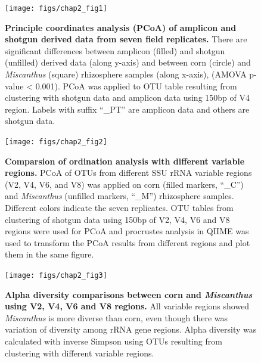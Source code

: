 \documentclass[]{msu-thesis}
\begin{document}
\begin{figure}[tbph!]
  \centering
  \texttt{[image: figs/chap2\_fig1]}
  \caption[Principle coordinates analysis (PCoA) of amplicon and shotgun derived data from seven field replicates]{\textbf{Principle coordinates analysis (PCoA) of amplicon and shotgun derived data from seven field replicates.} There are significant differences between amplicon (filled) and shotgun (unfilled) derived data (along y-axis) and between corn (circle) and \textit{Miscanthus} (square) rhizosphere samples (along x-axis), (AMOVA p-value < 0.001). PCoA was applied to OTU table resulting from clustering with shotgun data and amplicon data using 150bp of V4 region. Labels with suffix ``\_PT'' are amplicon data and others are shotgun data.}
  \label{fig:chap2Fig1}
\end{figure}


\begin{figure}[tbph!]
  \centering
  \texttt{[image: figs/chap2\_fig2]}
  \caption[Comparsion of ordination analysis with different variable regions]{\textbf{Comparsion of ordination analysis with different variable regions.} PCoA of OTUs from different SSU rRNA variable regions (V2, V4, V6, and V8) was applied on corn (filled markers, ``\_C'') and \textit{Miscanthus} (unfilled markers, ``\_M'') rhizosphere samples. Different colors indicate the seven replicates. OTU tables from clustering of shotgun data using 150bp of V2, V4, V6 and V8 regions were used for PCoA and procrustes analysis in QIIME was used to transform the PCoA results from different regions and plot them in the same figure.}
  \label{fig:chap2Fig2}
\end{figure}


\begin{figure}[tbph!]
  \centering
  \texttt{[image: figs/chap2\_fig3]}
  \caption[Alpha diversity comparisons between corn and \textit{Miscanthus} using V2, V4, V6 and V8 regions]{\textbf{Alpha diversity comparisons between corn and \textit{Miscanthus} using V2, V4, V6 and V8 regions.} All variable regions showed \textit{Miscanthus} is more diverse than corn, even though there was variation of diversity among rRNA gene regions. Alpha diversity was calculated with inverse Simpson using OTUs resulting from clustering with different variable regions.}
  \label{fig:chap2Fig3}
\end{figure}
\end{document}
